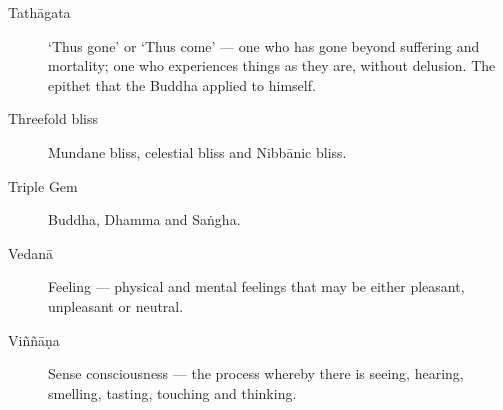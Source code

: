 \begin{description}
\item[Tathāgata] ‘Thus gone’ or ‘Thus come’ --- one who has gone beyond
  suffering and mortality; one who experiences things as they are,
  without delusion. The epithet that the Buddha applied to himself.

\item[Threefold bliss] Mundane bliss, celestial bliss and Nibbānic
  bliss.

\item[Triple Gem] Buddha, Dhamma and Saṅgha.

\item[Vedanā] Feeling --- physical and mental feelings that may be either
  pleasant, unpleasant or neutral.

\item[Viññāṇa] Sense consciousness --- the process whereby there is
  seeing, hearing, smelling, tasting, touching and thinking.

\end{description}

